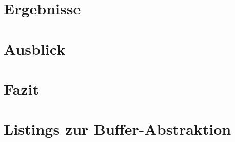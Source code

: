 \documentclass[m,twoside,intern,palatino]{cgBA}
\begin{document}
\section{Ergebnisse}

	

\section{Ausblick}

	

\section{Fazit}



\cite{Stam99stablefluids}
\cite{Stam03realtimefluid}
\cite{Bridson2007FluidSimCourseNotes}
\cite{Muller2003}
\cite{Goswami2010}
\cite{Green2009FluidRenderingCurvatureFlow}
\cite{Peschel2009}
\cite{Steil2007}
\cite{Eberly2004}
\cite{Grand2008}
\cite{Harris2007}
	

	
	
	
\appendix
\section{Listings zur Buffer-Abstraktion}
	\label{append:bufferListings}
	





\end{document}

